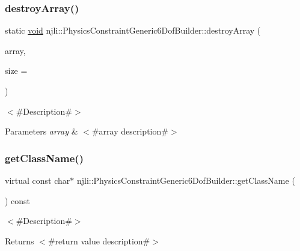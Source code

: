 \subsubsection{\texorpdfstring{destroy\+Array()}{destroyArray()}}
{\footnotesize\ttfamily static \mbox{\hyperlink{_thread_8h_af1e856da2e658414cb2456cb6f7ebc66}{void}} njli\+::\+Physics\+Constraint\+Generic6\+Dof\+Builder\+::destroy\+Array (\begin{DoxyParamCaption}\item[{\mbox{\hyperlink{classnjli_1_1_physics_constraint_generic6_dof_builder}{Physics\+Constraint\+Generic6\+Dof\+Builder}} $\ast$$\ast$}]{array,  }\item[{const \mbox{\hyperlink{_util_8h_a10e94b422ef0c20dcdec20d31a1f5049}{u32}}}]{size = {} }\end{DoxyParamCaption})\hspace{0.3cm}{\ttfamily [static]}}

$<$\#\+Description\#$>$


\begin{DoxyParams}{Parameters}
{\em array} & $<$\#array description\#$>$ \\
\hline
\end{DoxyParams}
\mbox{\label{classnjli_1_1_physics_constraint_generic6_dof_builder_a9b5207d1250b97df3ac9b63668158ec9}} 
\subsubsection{\texorpdfstring{get\+Class\+Name()}{getClassName()}}
{\footnotesize\ttfamily virtual const char$\ast$ njli\+::\+Physics\+Constraint\+Generic6\+Dof\+Builder\+::get\+Class\+Name (\begin{DoxyParamCaption}{ }\end{DoxyParamCaption}) const\hspace{0.3cm}{\ttfamily [virtual]}}

$<$\#\+Description\#$>$

\begin{DoxyReturn}{Returns}
$<$\#return value description\#$>$ 
\end{DoxyReturn}


